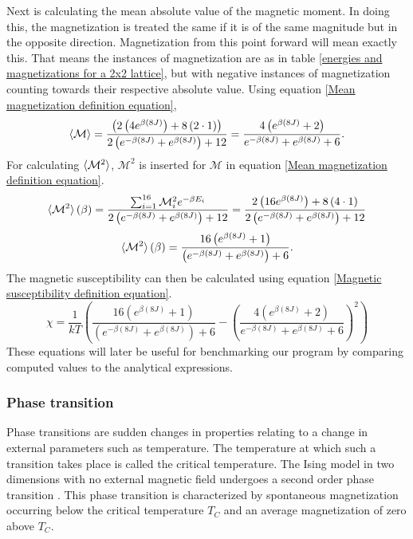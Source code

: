 \documentclass[10pt,a4paper]{article}
\begin{document}
Next is calculating the mean absolute value of the magnetic moment. In doing this, the magnetization is treated the same if it is of the same magnitude but in the opposite direction. Magnetization from this point forward will mean exactly this. That means the instances of magnetization are as in table \ref{energies and magnetizations for a 2x2 lattice}, but with negative instances of magnetization counting towards their respective absolute value. Using equation \eqref{Mean magnetization definition equation},
\begin{equation*}
\braket{\mathcal{M}} = \frac{\left( 2\left( 4e^{\beta (8J)} \right) +8\left( 2\cdot1 \right)\right)}{2\left( e^{-\beta (8J)} +e^{\beta (8J)} \right)+12} = \frac{4\left(  e^{\beta (8J)}  +2\right)}{ e^{-\beta (8J)} +e^{\beta (8J)}+6}.
\end{equation*}
For calculating $\braket{\mathcal{M}^2}$, $\mathcal{M}^2$ is inserted for $\mathcal{M}$ in equation \eqref{Mean magnetization definition equation}.
\begin{equation*}
\braket{\mathcal{M}^2}(\beta) = \frac{\sum_{i=1}^{16} \mathcal{M}_i^2e^{-\beta E_i}}{2\left( e^{-\beta (8J)} +e^{\beta (8J)} \right)+12}  = \frac{2\left( 16e^{\beta (8J)} \right) +8\left( 4\cdot1 \right)}{2\left( e^{-\beta (8J)} +e^{\beta (8J)} \right)+12}  
\end{equation*}
\begin{equation}
\braket{\mathcal{M}^2}(\beta) = \frac{ 16\left( e^{\beta (8J)}  +1 \right)}{\left( e^{-\beta (8J)} +e^{\beta (8J)} \right)+6}.
\end{equation}
The magnetic susceptibility can then be calculated using equation \eqref{Magnetic susceptibility definition equation}.
\begin{equation}
\chi = \frac{1}{kT}\left( \frac{ 16\left( e^{\beta (8J)}  +1 \right)}{\left( e^{-\beta (8J)} +e^{\beta (8J)} \right)+6} - \left( \frac{4\left(  e^{\beta (8J)}  +2\right)}{ e^{-\beta (8J)} +e^{\beta (8J)}+6} \right)^2 \right)
\end{equation}
These equations will later be useful for benchmarking our program by comparing computed values to the analytical expressions.
\subsubsection{Phase transition}
Phase transitions are sudden changes in properties relating to a change in external parameters such as temperature. The temperature at which such a transition takes place is called the critical temperature. The Ising model in two dimensions with no external magnetic field undergoes a second order phase transition \cite{Lecture_Notes_Fall_2015}. This phase transition is characterized by spontaneous magnetization occurring below the critical temperature $T_C$ and an average magnetization of zero above $T_C$\cite{Lecture_Notes_Fall_2015}.
\end{document}
